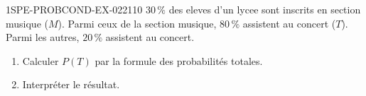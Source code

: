 \begin{exercice}{1SPE-PROBCOND-EX-022}{1}{10}
$30\,\%$ des eleves d'un lycee sont inscrits en section musique ($M$). Parmi ceux de la section musique, $80\,\%$ assistent au concert ($T$). Parmi les autres, $20\,\%$ assistent au concert.

\begin{enumerate}
  \item Calculer $P(T)$ par la formule des probabilités totales.
  \item Interpréter le résultat.
\end{enumerate}
\end{exercice}
